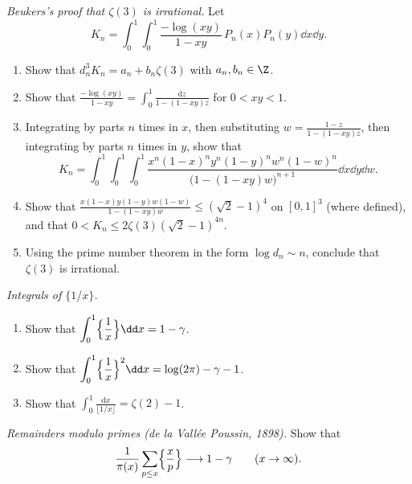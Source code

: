\begin{exercise}[Journey]\label{pb:beukersthree}
\emph{Beukers's proof that $\zeta(3)$ is irrational.} Let
\[
K_n=\int_0^1\!\!\int_0^1\frac{-\log(xy)}{1-xy}\,P_n(x)P_n(y)\dd x\dd y.
\]
\begin{enumerate}[label=(\alph*)]
\item Show that $d_n^3K_n=a_n+b_n\zeta(3)$ with $a_n,b_n\in\Z$.
\item Show that $\frac{-\log(xy)}{1-xy}=\int_0^1\frac{\mathrm dz}{1-(1-xy)z}$ for $0<xy<1$.
\item Integrating by parts $n$ times in $x$, then substituting $w=\frac{1-z}{1-(1-xy)z}$, then integrating by parts $n$ times in $y$, show that
\[
K_n=\int_0^1\!\!\int_0^1\!\!\int_0^1\frac{x^n(1-x)^ny^n(1-y)^nw^n(1-w)^n}{\bigl(1-(1-xy)w\bigr)^{n+1}}\dd x\dd y\dd w.
\]
\item Show that $\frac{x(1-x)y(1-y)w(1-w)}{1-(1-xy)w}\le(\sqrt2-1)^4$ on $[0,1]^3$ (where defined), and that $0<K_n\le2\zeta(3)(\sqrt2-1)^{4n}$.
\item Using the prime number theorem in the form $\log d_n\sim n$, conclude that $\zeta(3)$ is irrational.
\end{enumerate}
\end{exercise}

\begin{exercise}[$\star\star$]\label{pb:fracint}
\emph{Integrals of $\{1/x\}$.}
\begin{enumerate}[label=(\alph*)]
\item Show that $\displaystyle\int_0^1\Bigl\{\frac1x\Bigr\}\dd x=1-\gamma$.
\item Show that $\displaystyle\int_0^1\Bigl\{\frac1x\Bigr\}^2\dd x=\log(2\pi)-\gamma-1$.
\item Show that $\displaystyle\int_0^1\frac{\mathrm dx}{\lfloor1/x\rfloor}=\zeta(2)-1$.
\end{enumerate}
\end{exercise}

\begin{exercise}[$\star\star\star$]\label{pb:primefrac}
\emph{Remainders modulo primes (de la Vallée Poussin, 1898).} Show that
\[
\frac1{\pi(x)}\sum_{p\le x}\Bigl\{\frac xp\Bigr\}\longrightarrow1-\gamma\qquad(x\to\infty).
\]
\end{exercise}

